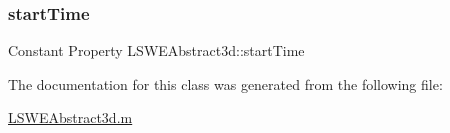 \subsubsection{\texorpdfstring{start\+Time}{startTime}}
{\footnotesize\ttfamily Constant Property L\+S\+W\+E\+Abstract3d\+::start\+Time}



The documentation for this class was generated from the following file\+:\begin{DoxyCompactItemize}
\item 
\hyperlink{_l_s_w_e_abstract3d_8m}{L\+S\+W\+E\+Abstract3d.\+m}\end{DoxyCompactItemize}
